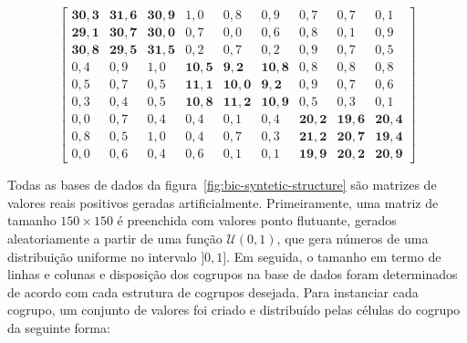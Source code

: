 \documentclass[
    12pt,                %
    oneside,            %
    a4paper,            %
    english,            %
    brazil                %
    ]{abntex2ppgsi}
\begin{document}
\[
    \begin{bmatrix}
        \mathbf{30,3} & \mathbf{31,6} & \mathbf{30,9} & 1,0           & 0,8           & 0,9           & 0,7           & 0,7           & 0,1           \\
        \mathbf{29,1} & \mathbf{30,7} & \mathbf{30,0} & 0,7           & 0,0           & 0,6           & 0,8           & 0,1           & 0,9           \\
        \mathbf{30,8} & \mathbf{29,5} & \mathbf{31,5} & 0,2           & 0,7           & 0,2           & 0,9           & 0,7           & 0,5           \\
        0,4           & 0,9           & 1,0           & \mathbf{10,5} & \mathbf{9,2}  & \mathbf{10,8} & 0,8           & 0,8           & 0,8           \\
        0,5           & 0,7           & 0,5           & \mathbf{11,1} & \mathbf{10,0} & \mathbf{9,2}  & 0,9           & 0,7           & 0,6           \\
        0,3           & 0,4           & 0,5           & \mathbf{10,8} & \mathbf{11,2} & \mathbf{10,9} & 0,5           & 0,3           & 0,1           \\
        0,0           & 0,7           & 0,4           & 0,4           & 0,1           & 0,4           & \mathbf{20,2} & \mathbf{19,6} & \mathbf{20,4} \\
        0,8           & 0,5           & 1,0           & 0,4           & 0,7           & 0,3           & \mathbf{21,2} & \mathbf{20,7} & \mathbf{19,4} \\
        0,0           & 0,6           & 0,4           & 0,6           & 0,1           & 0,1           & \mathbf{19,9} & \mathbf{20,2} & \mathbf{20,9}
    \end{bmatrix}
\]

Todas as bases de dados da figura~\ref{fig:bic-syntetic-structure} são matrizes de valores reais positivos geradas artificialmente.
Primeiramente, uma matriz de tamanho $150 \times 150$ é preenchida com valores ponto flutuante, gerados aleatoriamente a partir de uma função $\mathcal{U}(0, 1)$, que gera números de uma distribuição uniforme no intervalo $]0, 1]$.
Em seguida, o tamanho em termo de linhas e colunas e disposição dos cogrupos na base de dados foram determinados de acordo com cada estrutura de cogrupos desejada.
Para instanciar cada cogrupo, um conjunto de valores foi criado e distribuído pelas células do cogrupo da seguinte forma:
\end{document}
